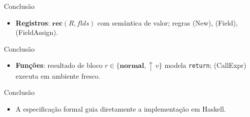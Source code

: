 \begin{frame}{Conclusão}

    \begin{itemize}

        \item
        \textbf{Registros}: \(\mathbf{rec}(R, \mathit{flds})\) com semântica
        de valor; regras (New), (Field), (FieldAssign).
    \end{itemize}
\end{frame}

\begin{frame}[fragile]{Conclusão}

    \begin{itemize}

        \item
        \textbf{Funções}: resultado de bloco
        \(r \in \{\mathbf{normal}, {\uparrow}\,v\}\) modela
        \texttt{return}; (CallExpr) executa em ambiente
        fresco.
    \end{itemize}
\end{frame}

\begin{frame}{Conclusão}

    \begin{itemize}

        \item
        A especificação formal guia diretamente a implementação em Haskell.
    \end{itemize}
\end{frame}
